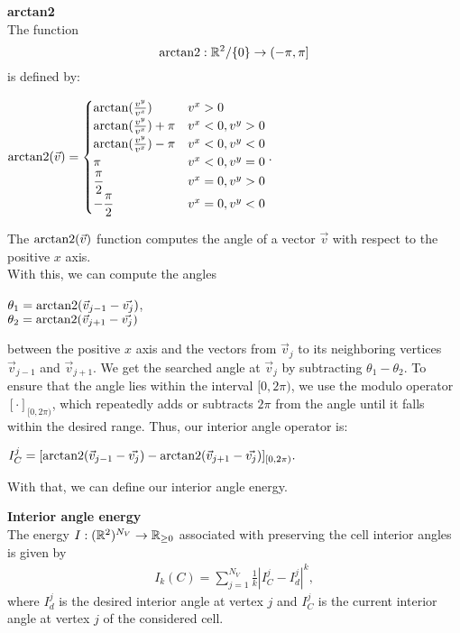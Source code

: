 \begin{definition} \textbf{arctan2} \\
	The function $$\operatorname{arctan2}:\mathbb{R}^2/\{0\} \rightarrow (-\pi, \pi]$$ is defined by:
	\begin{center}
		$ \operatorname{arctan2}(\vec{v}) = 
		\begin{cases}
			\arctan(\frac{v^{y}}{v^{x}}) & v^{x} > 0 \\
			\arctan(\frac{v^{y}}{v^{x}}) + \pi & v^{x} < 0, v^{y} > 0 \\
			\arctan(\frac{v^{y}}{v^{x}}) - \pi & v^{x} < 0, v^{y} < 0 \\
			\pi & v^{x} < 0, v^{y} = 0 \\
			\dfrac{\pi}{2} & v^{x} = 0, v^{y} > 0 \\ 		
			- \dfrac{\pi}{2} & v^{x} = 0, v^{y} < 0 \\ 
		\end{cases}. $
	\end{center}
\end{definition}

The $\operatorname{arctan2}(\vec{v})$ function computes the angle of a vector $\vec{v}$ with respect to the positive $x$ axis. \\
With this, we can compute the angles 
\begin{center}
	
	$\theta_1 = \operatorname{arctan2}( \vec{v}_{j-1} - \vec{v_j} )$, \\
	$\theta_2 = \operatorname{arctan2}( \vec{v}_{j+1} - \vec{v_j} )$
	
\end{center}
between the positive $x$ axis and the vectors from $\vec{v}_j$ to its neighboring vertices $\vec{v}_{j-1}$ and $\vec{v}_{j+1}$. 
We get the searched angle at $\vec{v}_j$ by subtracting $\theta_1 - \theta_2$.
To ensure that the angle lies within the interval $[0, 2\pi)$, we use the modulo operator $[ \cdot ]_{[0,2\pi)}$, which repeatedly adds or subtracts $2\pi$ from the angle until it falls within the desired range.
Thus, our interior angle operator is: 
\begin{center}
	$
	I^j_C = [\operatorname{arctan2}(\vec{v}_{j-1} - \vec{v_j}) - \operatorname{arctan2}(\vec{v}_{j+1} - \vec{v_j})]_{[0,2\pi)}.
	$
\end{center}

With that, we can define our interior angle energy. 
\begin{definition} \textbf{Interior angle energy} \\
	The energy $I: (\mathbb{R}^2)^{N_V} \rightarrow \mathbb{R}_{\geq 0}$ associated with preserving the cell interior angles is given by
	\begin{align}
		I_k(C) = \sum\limits_{j=1}^{N_V} \frac{1}{k}| I^j_{C} - I^{j}_d |^k, 
	\end{align}
	where $I^{j}_d$ is the desired interior angle at vertex $j$ and $I^j_{C}$ is the current interior angle at vertex $j$ of the considered cell. 
\end{definition}


